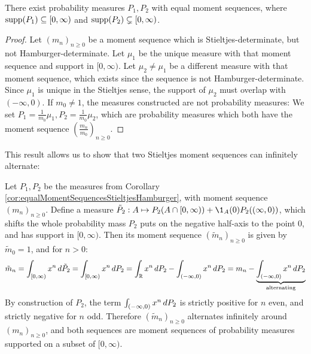 \documentclass[a4paper]{scrreprt}
\begin{document}
    \begin{cor}
        There exist probability measures $P_1, P_2$ with equal moment sequences, where $\supp (P_1) \subseteq [0, \infty)$ and $\supp (P_2) \subsetneq [0, \infty)$.
        \label{cor:equalMomentSequencesStieltjesHamburger}
    \end{cor}
    \begin{proof}
        Let $(m_n)_{n \geq 0}$ be a moment sequence which is Stieltjes-determinate, but not Hamburger-determinate.
        Let $\mu_1$ be the unique measure with that moment sequence and support in $[0, \infty)$.
        Let $\mu_2 \neq \mu_1$ be a different measure with that moment sequence, which exists since the sequence is not Hamburger-determinate. 
        Since $\mu_1$ is unique in the Stieltjes sense, the support of $\mu_2$ must overlap with $(-\infty, 0)$.
        If $m_0 \neq 1$, the measures constructed are not probability measures: 
        We set $P_1 = \frac{1}{m_0}\mu_1, P_2 = \frac{1}{m_0}\mu_2$, which are probability measures which both have the moment sequence $(\frac{m_n}{m_0})_{n \geq 0}$.
    \end{proof}
    
    This result allows us to show that two Stieltjes moment sequences can infinitely alternate: 
    \begin{ex}
        Let $P_1, P_2$ be the measures from Corollary \ref{cor:equalMomentSequencesStieltjesHamburger}, with moment sequence $(m_n)_{n \geq 0}$.
        Define a measure $\tilde{P}_2: A \mapsto P_2(A \cap [0, \infty)) + \1_A(0) P_2((\infty, 0))$, which shifts the whole probability mass $P_2$ puts on the negative half-axis to the point $0$, and has support in $[0, \infty)$.
        Then its moment sequence $(\tilde{m}_n)_{n \geq 0}$ is given by $\tilde{m}_0 = 1$, and for $n > 0$:
        \begin{gather*}
            \tilde{m}_n 
            = \lintegral{[0, \infty)}{x^n}{\tilde{P}_2}
            = \lintegral{[0, \infty)}{x^n}{P_2}
            = \lintegral{\R}{x^n}{P_2} - \lintegral{(-\infty, 0)}{x^n}{P_2}
            = m_n - \undersetbrace{\lintegral{(-\infty, 0)}{x^n}{P_2}}{\text{alternating}}
        \end{gather*}
        By construction of $P_2$, the term $\lintegral{(-\infty, 0)}{x^n}{P_2}$ is strictly positive for $n$ even, and strictly negative for $n$ odd.
        Therefore $(\tilde{m}_n)_{n \geq 0}$ alternates infinitely around $(m_n)_{n \geq 0}$,
        and both sequences are moment sequences of probability measures supported on a subset of $[0, \infty)$.
    \end{ex}
\end{document}

